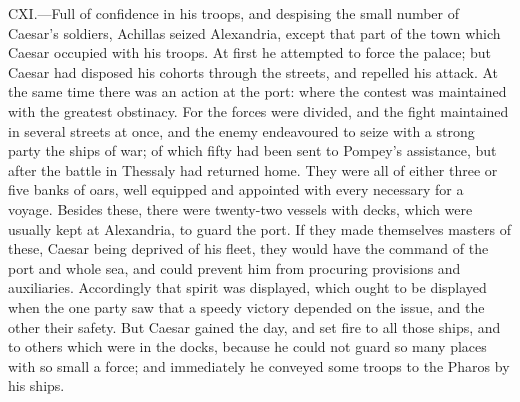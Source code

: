 CXI.—Full of confidence in his troops, and despising the small number
of Caesar's soldiers, Achillas seized Alexandria, except that part of
the town which Caesar occupied with his troops. At first he attempted to
force the palace; but Caesar had disposed his cohorts through the
streets, and repelled his attack. At the same time there was an action
at the port: where the contest was maintained with the greatest
obstinacy. For the forces were divided, and the fight maintained in
several streets at once, and the enemy endeavoured to seize with a
strong party the ships of war; of which fifty had been sent to Pompey's
assistance, but after the battle in Thessaly had returned home. They
were all of either three or five banks of oars, well equipped and
appointed with every necessary for a voyage. Besides these, there were
twenty-two vessels with decks, which were usually kept at Alexandria, to
guard the port. If they made themselves masters of these, Caesar being
deprived of his fleet, they would have the command of the port and whole
sea, and could prevent him from procuring provisions and auxiliaries.
Accordingly that spirit was displayed, which ought to be displayed when
the one party saw that a speedy victory depended on the issue, and the
other their safety. But Caesar gained the day, and set fire to all those
ships, and to others which were in the docks, because he could not guard
so many places with so small a force; and immediately he conveyed some
troops to the Pharos by his ships.


